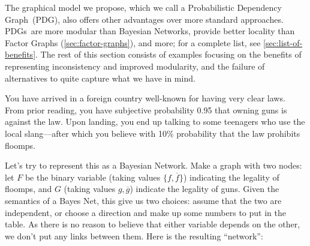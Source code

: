 \documentclass{article}
\newcommand\changed[1]{{\color{note-fg} #1}}
\newcommand{\modelname}{Probabilistic Dependency Graph}
\newcommand{\MN}{PDG}%
\newcommand{\MNs}{PDGs}
\begin{document}
	\changed{The graphical model we propose, which we call a \modelname\ (\MN),
	also offers other advantages over more standard approaches. \MNs\ are more modular than Bayesian Networks, provide better locality than Factor Graphs (\cref{sec:factor-graphs}), and more; for a complete list, see \cref{sec:list-of-benefits}.
	The rest of this section consists of examples focusing on the benefits of representing inconsistency and improved modularity, } 
	and the failure of alternatives to quite capture what we have in mind.
	
	\begin{example}\label{ex:guns-and-floomps}
		You have arrived in a foreign country well-known for having very clear laws. From prior reading, you have subjective probability 0.95 that owning guns is against the law. Upon landing, you end up talking to some teenagers who use the local slang---after which you believe with 10\% probability that the law prohibits floomps.
		
		Let's try to represent this as a Bayesian Network. Make a graph with two nodes: let $F$ be the binary variable (taking values $\{f, \overline f\}$) indicating the legality of floomps, and $G$ (taking values $g, \overline g$) indicate the legality of guns. 
		Given the semantics of a Bayes Net, this give us two choices: assume that the two are independent, or choose a direction and make up some numbers to put in the table.
		As there is no reason to believe that either variable depends on the other, we don't put any links between them.
		Here is the resulting ``network'':	
		
		\begin{center}
		\end{center}
		

\end{example}
\end{document}
